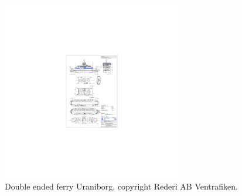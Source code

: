 \documentclass[fleqn,10pt]{olplainarticle}
\begin{document}
\begin{figure}[!htb]
    \centering
    \includegraphics[width=0.7\textwidth]{figures/GA_uraniborg.pdf}
    \caption{Double ended ferry Uraniborg, copyright Rederi AB Ventrafiken.}
    \label{fig:uraniborg}
\end{figure}
\end{document}
